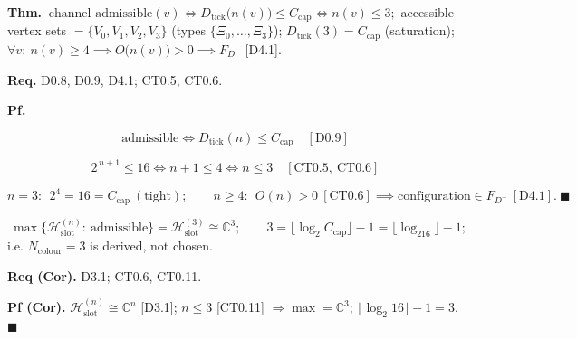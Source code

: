 \begin{theorem}\label{tag:CT0-11}
\textbf{Thm.} $\ \text{channel-admissible}(v)\iff D_{\mathrm{tick}}\bigl(n(v)\bigr)\le C_{\mathrm{cap}}\iff n(v)\le3;$ accessible vertex sets $=\{V_0,V_1,V_2,V_3\}$ (types $\{\Xi_0,\dots,\Xi_3\}$); $D_{\mathrm{tick}}(3)=C_{\mathrm{cap}}$ (saturation); $\forall v:\ n(v)\ge4\implies O\bigl(n(v)\bigr)>0\implies F_{D^-}$ [D4.1].

\textbf{Req.} D0.8, D0.9, D4.1; CT0.5, CT0.6.

\textbf{Pf.}

\[
\text{admissible}\iff D_{\mathrm{tick}}(n)\le C_{\mathrm{cap}}\quad[\mathrm{D0.9}]
\]

\[
2^{\,n+1}\le16\iff n+1\le4\iff n\le3\quad[\mathrm{CT0.5},\ \mathrm{CT0.6}]
\]

\[
n=3:\ \ 2^{4}=16=C_{\mathrm{cap}}\ (\text{tight});\qquad
n\ge4:\ \ O(n)>0\ [\mathrm{CT0.6}]\implies\text{configuration}\in F_{D^-}\ [\mathrm{D4.1}].\ \blacksquare
\]

\end{theorem}

\begin{corollary}\label{tag:CT0-11a}
$\ \max\{\mathcal H^{(n)}_{\mathrm{slot}}:\ \text{admissible}\}=\mathcal H^{(3)}_{\mathrm{slot}}\cong\mathbb C^3;\qquad 3=\lfloor\log_2 C_{\mathrm{cap}}\rfloor-1=\lfloor\log_216\rfloor-1;$ i.e. $N_{\text{colour}}=3$ is derived, not chosen.

\textbf{Req (Cor).} D3.1; CT0.6, CT0.11.

\textbf{Pf (Cor).} $\mathcal H^{(n)}_{\mathrm{slot}}\cong\mathbb C^n$ [D3.1]; $n\le3$ [CT0.11] $\Rightarrow\max=\mathbb C^3$; $\lfloor\log_2 16\rfloor-1=3$. $\blacksquare$

\end{corollary}

